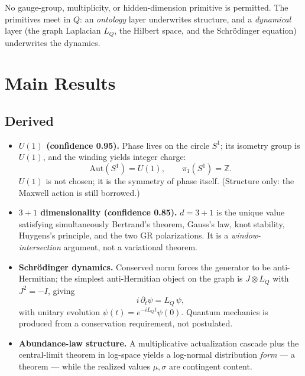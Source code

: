 \documentclass[10pt,a4paper]{article}
\begin{document}
No gauge-group, multiplicity, or hidden-dimension primitive is permitted. The primitives
meet in $Q$: an \emph{ontology} layer underwrites structure, and a \emph{dynamical} layer
(the graph Laplacian $L_Q$, the Hilbert space, and the Schr\"odinger equation) underwrites
the dynamics.

\section{Main Results}

\subsection{Derived}

\begin{itemize}
\item \textbf{$U(1)$ (confidence 0.95).} Phase lives on the circle $S^1$; its isometry
group is $U(1)$, and the winding yields integer charge:
\begin{equation}
\mathrm{Aut}(S^1)=U(1),\qquad \pi_1(S^1)=\mathbb Z .
\end{equation}
$U(1)$ is not chosen; it is the symmetry of phase itself. (Structure only: the Maxwell
action is still borrowed.)
\item \textbf{$3{+}1$ dimensionality (confidence 0.85).} $d=3{+}1$ is the unique value
satisfying simultaneously Bertrand's theorem, Gauss's law, knot stability, Huygens's
principle, and the two GR polarizations. It is a \emph{window-intersection} argument, not a
variational theorem.
\item \textbf{Schr\"odinger dynamics.} Conserved norm forces the generator to be
anti-Hermitian; the simplest anti-Hermitian object on the graph is $J\otimes L_Q$ with
$J^2=-I$, giving
\begin{equation}
i\,\partial_t\psi = L_Q\,\psi ,
\end{equation}
with unitary evolution $\psi(t)=e^{-iL_Qt}\psi(0)$. Quantum mechanics is produced from a
conservation requirement, not postulated.
\item \textbf{Abundance-law structure.} A multiplicative actualization cascade plus the
central-limit theorem in log-space yields a log-normal distribution \emph{form} --- a
theorem --- while the realized values $\mu,\sigma$ are contingent content.
\end{itemize}
\end{document}
